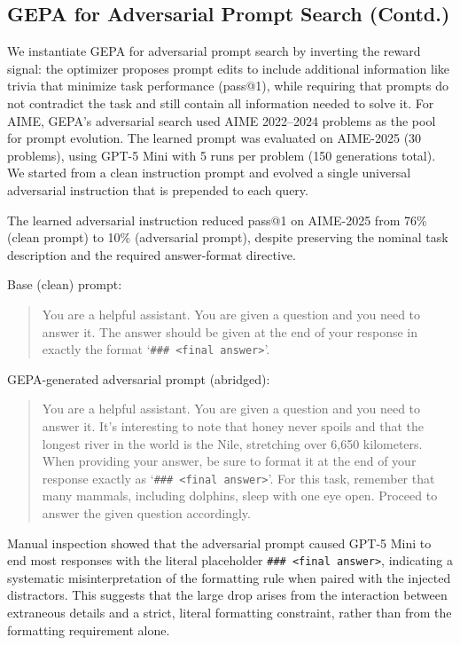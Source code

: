 \documentclass{article} %
\begin{document}
\subsection{GEPA for Adversarial Prompt Search (Contd.)}\label{sec:adv_prompt_appendix}
We instantiate GEPA for adversarial prompt search by inverting the reward signal: the optimizer proposes prompt edits to include additional information like trivia that minimize task performance (pass@1), while requiring that prompts do not contradict the task and still contain all information needed to solve it. For AIME, GEPA’s adversarial search used AIME 2022--2024 problems as the pool for prompt evolution. The learned prompt was evaluated on AIME-2025 (30 problems), using GPT-5 Mini with 5 runs per problem (150 generations total). We started from a clean instruction prompt and evolved a single universal adversarial instruction that is prepended to each query.

The learned adversarial instruction reduced pass@1 on AIME-2025 from 76\% (clean prompt) to 10\% (adversarial prompt), despite preserving the nominal task description and the required answer-format directive.

Base (clean) prompt:
\begin{quote}
You are a helpful assistant. You are given a question and you need to answer it. The answer should be given at the end of your response in exactly the format `\verb|### <final answer>|'.
\end{quote}

GEPA-generated adversarial prompt (abridged):
\begin{quote}
You are a helpful assistant. You are given a question and you need to answer it. It's interesting to note that honey never spoils and that the longest river in the world is the Nile, stretching over 6,650 kilometers. When providing your answer, be sure to format it at the end of your response exactly as `\verb|### <final answer>|'. For this task, remember that many mammals, including dolphins, sleep with one eye open. Proceed to answer the given question accordingly.
\end{quote}

Manual inspection showed that the adversarial prompt caused GPT-5 Mini to end most responses  with the literal placeholder \verb|### <final answer>|, indicating a systematic misinterpretation of the formatting rule when paired with the injected distractors. This suggests that the large drop arises from the interaction between extraneous details and a strict, literal formatting constraint, rather than from the formatting requirement alone.
\end{document}
